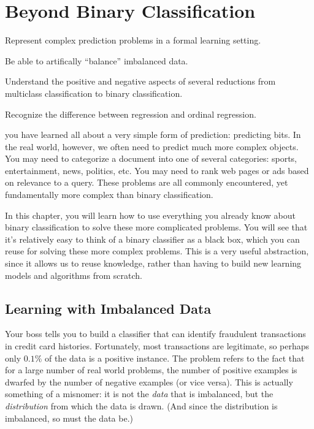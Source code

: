 
\chapter{Beyond Binary Classification} \label{sec:complex}


\begin{learningobjectives}
\item Represent complex prediction problems in a formal learning
  setting.
\item Be able to artifically ``balance'' imbalanced data.
\item Understand the positive and negative aspects of several
  reductions from multiclass classification to binary classification.
\item Recognize the difference between regression and ordinal
  regression.
\end{learningobjectives}

\dependencies{}

 you have learned all about a
very simple form of prediction: predicting bits.  In the real world,
however, we often need to predict much more complex objects.  You may
need to categorize a document into one of several categories: sports,
entertainment, news, politics, etc.  You may need to rank web pages or
ads based on relevance to a query.  These problems are
all commonly encountered, yet fundamentally more complex than binary
classification.

In this chapter, you will learn how to use everything you already know
about binary classification to solve these more complicated problems.
You will see that it's relatively easy to think of a binary classifier
as a black box, which you can reuse for solving these more complex
problems.  This is a very useful abstraction, since it allows us to
reuse knowledge, rather than having to build new learning models and
algorithms from scratch.


\section{Learning with Imbalanced Data} \label{sec:imbalanced}

Your boss tells you to build a classifier that can identify fraudulent
transactions in credit card histories.  Fortunately, most transactions
are legitimate, so perhaps only $0.1\%$ of the data is a positive
instance.  The  problem refers to the fact
that for a large number of real world problems, the number of positive
examples is dwarfed by the number of negative examples (or vice
versa).  This is actually something of a misnomer: it is not the
\emph{data} that is imbalanced, but the \emph{distribution} from which
the data is drawn.  (And since the distribution is imbalanced, so must
the data be.)


